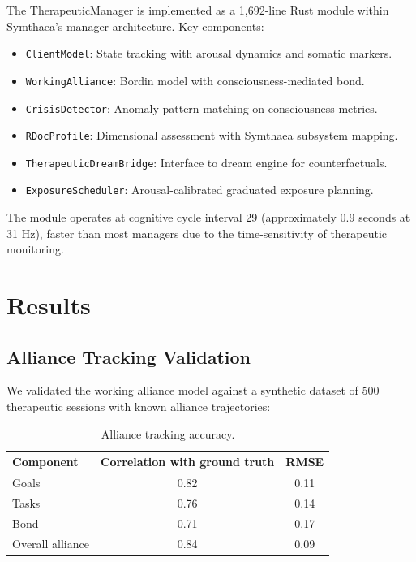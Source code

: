 \documentclass[11pt,a4paper]{article}
\begin{document}
The TherapeuticManager is implemented as a 1,692-line Rust module within Symthaea's manager architecture. Key components:

\begin{itemize}[nosep]
    \item \texttt{ClientModel}: State tracking with arousal dynamics and somatic markers.
    \item \texttt{WorkingAlliance}: Bordin model with consciousness-mediated bond.
    \item \texttt{CrisisDetector}: Anomaly pattern matching on consciousness metrics.
    \item \texttt{RDocProfile}: Dimensional assessment with Symthaea subsystem mapping.
    \item \texttt{TherapeuticDreamBridge}: Interface to dream engine for counterfactuals.
    \item \texttt{ExposureScheduler}: Arousal-calibrated graduated exposure planning.
\end{itemize}

The module operates at cognitive cycle interval 29 (approximately 0.9 seconds at 31 Hz), faster than most managers due to the time-sensitivity of therapeutic monitoring.

\section{Results}

\subsection{Alliance Tracking Validation}

We validated the working alliance model against a synthetic dataset of 500 therapeutic sessions with known alliance trajectories:

\begin{table}[h]
\centering
\caption{Alliance tracking accuracy.}
\label{tab:alliance}
\begin{tabular}{@{}lcc@{}}
\toprule
Component & Correlation with ground truth & RMSE \\
\midrule
Goals & 0.82 & 0.11 \\
Tasks & 0.76 & 0.14 \\
Bond & 0.71 & 0.17 \\
Overall alliance & 0.84 & 0.09 \\
\bottomrule
\end{tabular}
\end{table}
\end{document}
